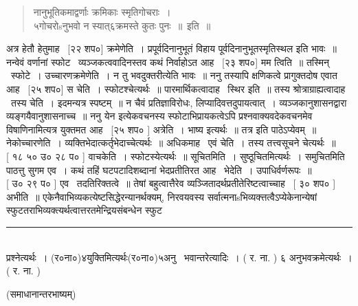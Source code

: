 \documentclass[11pt, openany]{book}
\begin{document}
\begin{multicols}{2}
\begin{quote}
{\qt नानुभूतिकमाद्वर्णाः क्रमिकाः स्मृतिगोचराः~।\\
५गोचरोsनुभवो न स्यात्६क्रमस्ते कुतः पुनः~॥~इति~॥}
\end{quote}

अत्र हेतौ हेतुमाह \textendash\ [२२ शप०] क्रमेणेति~। प्रपूर्वदिनानुभूतं विहाय पूर्वदिनानुभूतस्मृतिस्थल इति भावः~॥ नन्वेवं वर्णानां स्फोट \textendash\ व्यञ्जकत्ववादिनस्तव कथं निर्वाहोऽत आह \textendash\ [२३ शप०] मम त्विति~॥ तस्मिन् \textendash\ स्फोटे~। उच्चारणक्रमेणेति~। न तु भवदुक्तरीत्येति भावः~॥ ननु तस्यापि क्षणिकत्वे प्रागुक्तदोष एवात आह \textendash\ [२५ शप०] स चेति~। स्फोटश्चेत्यर्थः~॥ पारमार्थिकत्वादाह \textendash\ स्थिर इति~॥ तस्य श्रोत्राग्राह्यत्वादाह \textendash\ तस्य चेति~। इदमन्यत्र स्पष्टम्~॥ न चैवं प्रतिज्ञाविरोधः, लिप्यादिवत्तदुपायत्वात्~। व्यञ्जकानुशासनद्वारा व्यङ्गयैवानुशासनाच्च~॥ ननु {\qt येन} इत्येकवचनस्य स्फोटाभिप्रायकत्वेऽपि प्रश्नवाक्यवदेकवचनमेव विषाणिनामित्यत्र युक्तमत आह \textendash\ [२५ शप० ] अत्रेति~। भाष्य इत्यर्थः~॥ तत्र इति पाठेऽप्येवम्~॥ नेकोच्चारणेति~। व्यक्तिभेदात्कर्तृभेदाच्चेत्यर्थः~॥ अधिकमाह \textendash\ एवं चेति~। तस्य तत्त्वसूचने चेत्यर्थः~॥\\

[ १८ ५० उ० २८ प० ] वाचकेति~। स्फोटस्येत्यर्थः~॥ सूचितमिति~। सुष्ठूचितमित्यर्थः~। समुचितमिति पाठत्तु सुगम एव~। कथं तहिं घटपटादिशब्दानां भेदप्रतीतिरत आह \textendash\ भेदेति~। उपाधिर्वर्णरूपः~॥\\

[ उ० २९ प० ] एव \textendash\ तदतिरिक्तत्वे~॥ तेषां बहुत्वात्तैरेव व्यञ्जितादर्थप्रतीतेरिष्टत्वाच्चाह \textendash\ [ ३० शप० ] अभीति~॥ एकेनैवाभिव्यकत्येष्टसिद्धेरन्यानर्थक्यम्, निरवयवस्य सर्वात्मनाsभिव्यक्त्तत्वैऽप्येकेनान्येषां स्फुटतराभिव्यक्त्यर्थत्वात्तरतमेन्द्रियसंबन्धेन स्फुट \textendash\ 

\noindent
\rule{1\linewidth}{0.5pt}\\

\noindent
प्रश्नेत्यर्थः~। (र०ना०)४युक्तिमित्यर्थः(र०ना०)५अनु \textendash\ भवान्तरेत्यादिः~। ( र. ना. ) ६ अनुभवक्रमेत्यर्थः~। ( र. ना. )
\end{multicols}

\newpage

\begin{multicols}{2}

\end{multicols}

\begin{center}
(समाधानान्तरभाष्यम्)
\end{center}
\end{document}
